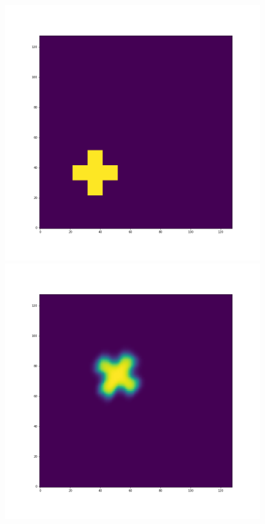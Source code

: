 \documentclass[12pt,a4paper]{article}
\begin{document}
\begin{figure}[H]
\centering
\begin{minipage}{.3\textwidth}
  \centering
  \includegraphics[width=\linewidth]{Pictures/PlusRotateTestMUSCL/PlusRotateTest_t0.png}
\end{minipage}%
\begin{minipage}{.3\textwidth}
  \centering
  \includegraphics[width=\linewidth]{Pictures/PlusRotateTestMUSCL/PlusRotateTest_t10.png}

\end{minipage}
\end{figure}
\end{document}
